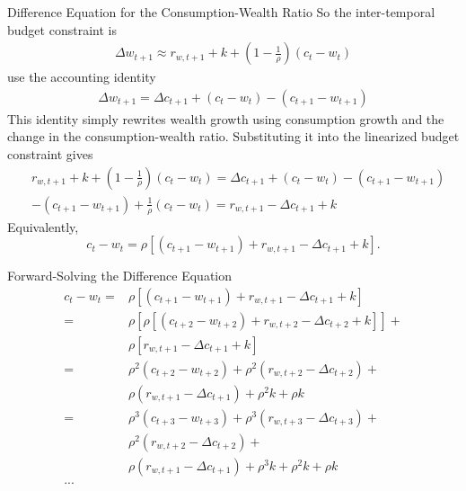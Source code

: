 \documentclass{beamer}
\begin{document}
\begin{frame}{Difference Equation for the Consumption-Wealth Ratio}
    \small
	So the inter-temporal budget constraint is
	\begin{align}
		\Delta w_{t+1} \approx r_{w,t+1}+k+\left(1-\frac{1}{\rho}\right)\left(c_{t}-w_{t}\right)
	\end{align}
	use the accounting identity
	\begin{align}
		\Delta w_{t+1}= \Delta c_{t+1}+\left(c_{t}-w_{t}\right)  -\left(c_{t+1}-w_{t+1}\right)
	\end{align}
    This identity simply rewrites wealth growth using consumption growth and the change in the consumption-wealth ratio. Substituting it into the linearized budget constraint gives
	\begin{align}
		&r_{w,t+1}+k+\left(1-\frac{1}{\rho}\right)\left(c_{t}-w_{t}\right) = \Delta c_{t+1}+\left(c_{t}-w_{t}\right)  -\left(c_{t+1}-w_{t+1}\right)\\
		&-\left(c_{t+1}-w_{t+1}\right)+\frac{1}{\rho}\left(c_{t}-w_{t}\right)=r_{w, t+1}-\Delta c_{t+1}+k
	\end{align}
    Equivalently,
    \begin{equation*}
        c_t-w_t=\rho\left[(c_{t+1}-w_{t+1})+r_{w,t+1}-\Delta c_{t+1}+k\right].
    \end{equation*}
\end{frame}

\begin{frame}{Forward-Solving the Difference Equation}
	\begin{align*}
		c_{t}-w_{t}=&\rho \left[\left(c_{t+1}-w_{t+1}\right)+r_{w,t+1}-\Delta c_{t+1}+k\right]\\
		= &\rho \left[\rho \left[\left(c_{t+2}-w_{t+2}\right)+r_{w,t+2}-\Delta c_{t+2}+k\right] \right] + \\
		& \rho \left[ r_{w,t+1}-\Delta c_{t+1}+k \right]\\
		= & \rho^2 \left(c_{t+2}-w_{t+2}\right) + \rho^2 \left(r_{w,t+2}-\Delta c_{t+2}\right) + \\
		& \rho \left(r_{w,t+1}-\Delta c_{t+1}\right) + \rho^2 k + \rho k \\
		= & \rho^3 \left(c_{t+3}-w_{t+3}\right) + \rho^3 \left(r_{w,t+3}-\Delta c_{t+3}\right) + \\
		& \rho^2 \left(r_{w,t+2}-\Delta c_{t+2}\right) + \\
		& \rho \left(r_{w,t+1}-\Delta c_{t+1}\right)+ \rho^3 k + \rho^2 k + \rho k \\
		...\\
	\end{align*}
\end{frame}
\end{document}
